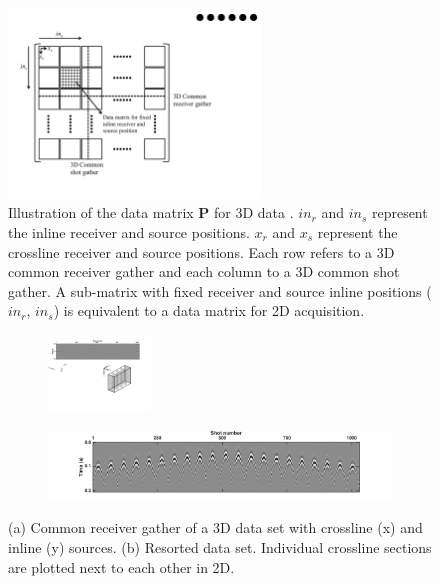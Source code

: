 \begin{figure}
	\centering
	\includegraphics[width=0.6\textwidth]{Plots/DelphiFormat}
	\caption{Illustration of the data matrix $\mathbf{P}$ for 3D data \citep{Delphi-Format}. $in_r$ and $in_s$ represent the inline receiver and source positions. $x_r$ and $x_s$ represent the crossline receiver and source positions. Each row refers to a 3D common receiver gather and each column to a 3D common shot gather. A sub-matrix with fixed receiver and source inline positions ($in_r$, $in_s$) is equivalent to a data matrix for 2D acquisition.}
	\label{fig:Ch-Theory-DelphiFormat}
\end{figure}


\begin{figure}
	
	\begin{subfigure}[t]{\textwidth}
	 	\centering
		\includegraphics[width = 0.3\textwidth]{Plots/data3d}
		\caption{}
		\label{fig:Ch-Theory-Data3d}
	\end{subfigure}
	\par\bigskip
	\begin{subfigure}[t]{\textwidth}
		\centering
		\includegraphics[width = \textwidth]{Plots/data3d_Delphi}
		\caption{}
		\label{fig:Ch-Theory-Data3d_Delphi}
	\end{subfigure}
	
	\caption{(a) Common receiver gather of a 3D data set with crossline (x) and inline (y) sources. (b) Resorted data set. Individual crossline sections are plotted next to each other in 2D.}
	\label{fig:Ch-Theory-DataSorting}
\end{figure}


